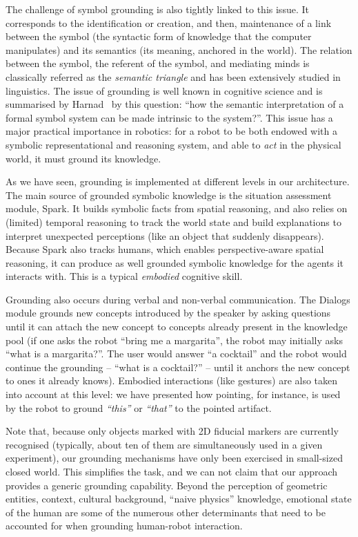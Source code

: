 \documentclass[preprint,3p,times]{elsarticle}
\begin{document}
The challenge of symbol grounding is also tightly linked to this issue. It
corresponds to the identification or creation, and then, maintenance of a link
between the symbol (the syntactic form of knowledge that the computer
manipulates) and its semantics (its meaning, anchored in the world). The
relation between the symbol, the referent of the symbol, and mediating minds
is classically referred as the \emph{semantic triangle} and has been
extensively studied in linguistics. The issue of grounding is well known in
cognitive science and is summarised by Harnad~\cite{Harnad1990} by this
question: ``how the semantic interpretation of a formal symbol system can be
made intrinsic to the system?''. This issue has a major practical importance in
robotics: for a robot to be both endowed with a symbolic representational and
reasoning system, and able to \emph{act} in the physical world, it must ground
its knowledge.

As we have seen, grounding is implemented at different levels in our
architecture. The main source of grounded symbolic knowledge is the situation
assessment module, {\sc Spark}. It builds symbolic facts from spatial reasoning,
and also relies on (limited) temporal reasoning to track the world state and
build explanations to interpret unexpected perceptions (like an object that
suddenly disappears). Because {\sc Spark} also tracks humans, which enables
perspective-aware spatial reasoning, it can produce as well grounded symbolic
knowledge for the agents it interacts with. This is a typical \emph{embodied}
cognitive skill.

Grounding also occurs during verbal and non-verbal communication. The {\sc
Dialogs} module grounds new concepts introduced by the speaker by asking
questions until it can attach the new concept to concepts already present in the
knowledge pool (if one asks the robot ``bring me a margarita'', the robot may
initially asks ``what is a margarita?''. The user would answer ``a cocktail''
and the robot would continue the grounding -- ``what is a cocktail?'' -- until
it anchors the new concept to ones it already knows). Embodied interactions
(like gestures) are also taken into account at this level: we have presented how
pointing, for instance, is used by the robot to ground \emph{``this''} or
\emph{``that''} to the pointed artifact.

Note that, because only objects marked with 2D fiducial markers are currently
recognised (typically, about ten of them are simultaneously used in a given
experiment), our grounding mechanisms have only been exercised in small-sized
closed world. This simplifies the task, and we can not claim that our approach
provides a generic grounding capability. Beyond the perception of geometric
entities, context, cultural background, ``naive physics'' knowledge, emotional
state of the human are some of the numerous other determinants that need to be
accounted for when grounding human-robot interaction.
\end{document}
